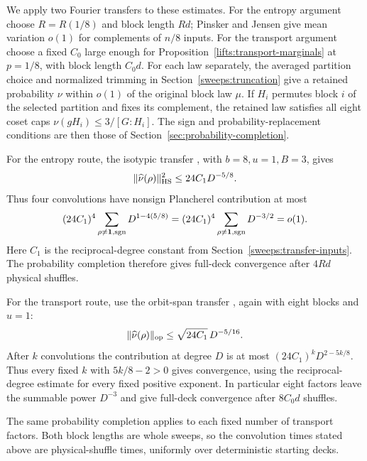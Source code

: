We apply two Fourier transfers to these estimates. For the entropy
argument choose $R=R(1/8)$ and block length $Rd$; Pinsker and Jensen
give mean variation $o(1)$ for complements of $n/8$ inputs. For the
transport argument choose a fixed $C_0$ large enough for
Proposition~\ref{lifts:transport-marginals} at $p=1/8$, with block
length $C_0d$. For each law separately, the averaged partition choice
and normalized trimming in Section~\ref{sweeps:truncation} give
a retained probability $\nu$ within $o(1)$ of the original block law
$\mu$. If $H_i$ permutes block $i$ of the selected partition and fixes
its complement, the retained law satisfies all eight coset caps
$\nu(gH_i)\le3/[G:H_i]$. The sign and probability-replacement
conditions are then those of Section~\ref{sec:probability-completion}.

For the entropy route, the isotypic transfer
\cite[Proposition~\ref*{l-l:isotypic}]{partialFourier}, with
$b=8,u=1,B=3$, gives
\[
 \|\widehat\nu(\rho)\|_{\mathrm{HS}}^2\le24C_1D^{-5/8}.
\]
Thus four convolutions have nonsign Plancherel contribution at most
\[
 (24C_1)^4\sum_{\rho\ne\mathbf1,\operatorname{sgn}}D^{1-4(5/8)}
 =(24C_1)^4\sum_{\rho\ne\mathbf1,\operatorname{sgn}}D^{-3/2}=o(1).
\]
Here $C_1$ is the reciprocal-degree constant from
Section~\ref{sweeps:transfer-inputs}. The probability completion
therefore gives full-deck convergence after $4Rd$ physical shuffles.

For the transport route, use the orbit-span transfer
\cite[Proposition~\ref*{l-l:orbit-span}]{partialFourier}, again with
eight blocks and $u=1$:
\[
 \|\widehat\nu(\rho)\|_{\mathrm{op}}
 \le\sqrt{24C_1}\,D^{-5/16}.
\]
After $k$ convolutions the contribution at degree $D$ is at most
$(24C_1)^kD^{2-5k/8}$. Thus every fixed $k$ with $5k/8-2>0$
gives convergence, using the reciprocal-degree estimate for every
fixed positive exponent. In particular eight factors leave the summable
power $D^{-3}$ and give full-deck convergence after $8C_0d$ shuffles.

The same probability completion applies to each fixed number of
transport factors. Both block lengths are whole sweeps, so the
convolution times stated above are physical-shuffle times, uniformly
over deterministic starting decks.
